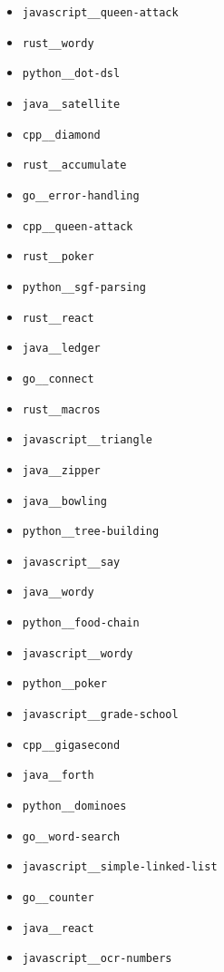 \begin{multicols}{2}
\begin{itemize}
    \item \texttt{javascript\_\_queen-attack}
    \item \texttt{rust\_\_wordy}
    \item \texttt{python\_\_dot-dsl}
    \item \texttt{java\_\_satellite}
    \item \texttt{cpp\_\_diamond}
    \item \texttt{rust\_\_accumulate}
    \item \texttt{go\_\_error-handling}
    \item \texttt{cpp\_\_queen-attack}
    \item \texttt{rust\_\_poker}
    \item \texttt{python\_\_sgf-parsing}
    \item \texttt{rust\_\_react}
    \item \texttt{java\_\_ledger}
    \item \texttt{go\_\_connect}
    \item \texttt{rust\_\_macros}
    \item \texttt{javascript\_\_triangle}
    \item \texttt{java\_\_zipper}
    \item \texttt{java\_\_bowling}
    \item \texttt{python\_\_tree-building}
    \item \texttt{javascript\_\_say}
    \item \texttt{java\_\_wordy}
    \item \texttt{python\_\_food-chain}
    \item \texttt{javascript\_\_wordy}
    \item \texttt{python\_\_poker}
    \item \texttt{javascript\_\_grade-school}
    \item \texttt{cpp\_\_gigasecond}
    \item \texttt{java\_\_forth}
    \item \texttt{python\_\_dominoes}
    \item \texttt{go\_\_word-search}
    \item \texttt{javascript\_\_simple-linked-list}
    \item \texttt{go\_\_counter}
    \item \texttt{java\_\_react}
    \item \texttt{javascript\_\_ocr-numbers}

\end{itemize}
\end{multicols}
